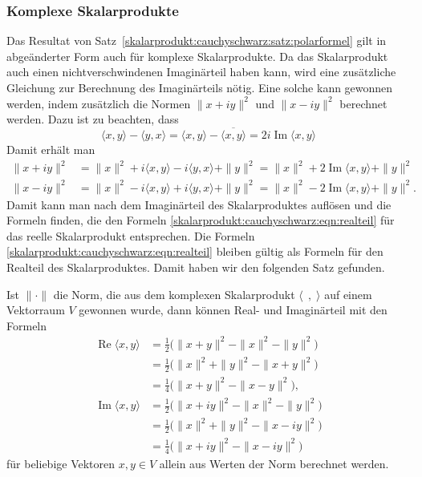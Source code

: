 \subsubsection{Komplexe Skalarprodukte}
Das Resultat von Satz~\ref{skalarprodukt:cauchyschwarz:satz:polarformel}
gilt in abgeänderter Form auch für komplexe Skalarprodukte.
Da das Skalarprodukt auch einen nichtverschwindenen Imaginärteil haben
kann, wird eine zusätzliche Gleichung zur Berechnung des Imaginärteils
nötig.
Eine solche kann gewonnen werden, indem zusätzlich die Normen
$\|x+iy\|^2$ und $\|x-iy\|^2$ berechnet werden.
Dazu ist zu beachten, dass
\[
\langle x,y\rangle
-
\langle y,x\rangle
=
\langle x,y\rangle
-
\overline{
\langle x,y\rangle
}
=
2i\operatorname{Im}\langle x,y\rangle
\]
Damit erhält man
\begin{align*}
\|x+iy\|^2 &= \|x\|^2 + i\langle x,y\rangle - i\langle y,x\rangle + \|y\|^2 
           = \|x\|^2 + 2\operatorname{Im}\langle x,y\rangle + \|y\|^2 \\
\|x-iy\|^2 &= \|x\|^2 - i\langle x,y\rangle + i\langle y,x\rangle + \|y\|^2 
           = \|x\|^2 - 2\operatorname{Im}\langle x,y\rangle + \|y\|^2.
\end{align*}
Damit kann man nach dem Imaginärteil des Skalarproduktes auflösen und
die Formeln
finden, die den Formeln
\eqref{skalarprodukt:cauchyschwarz:eqn:realteil}
für das reelle Skalarprodukt entsprechen.
Die Formeln
\eqref{skalarprodukt:cauchyschwarz:eqn:realteil}
bleiben gültig als Formeln für den Realteil des Skalarproduktes.
Damit haben wir den folgenden Satz gefunden.

\begin{satz}
%
Ist $\|\cdot\|$ die Norm, die aus dem komplexen Skalarprodukt
$\langle\;\,,\;\rangle$ auf einem Vektorraum $V$ gewonnen wurde,
dann können Real- und Imaginärteil mit den Formeln
\begin{align*}
\operatorname{Re}\langle x,y\rangle
&=
{\textstyle\frac12}\bigl(
\|x+y\|^2 - \|x\|^2 -\|y\|^2
\bigr)
\\
&=
{\textstyle\frac12}\bigl(
\|x\|^2 +\|y\|^2 - \|x+y\|^2
\bigr)
\\
&=
{\textstyle\frac14}\bigl(
\|x+y\|^2 - \|x-y\|^2
\bigr),
\\
\operatorname{Im}\langle x,y\rangle
&=
{\textstyle\frac12}\bigl(
\|x+iy\|^2-\|x\|^2-\|y\|^2
\bigr)
\\
&=
{\textstyle\frac12}\bigl(
\|x\|^2+\|y\|^2-\|x-iy\|^2
\bigr)
\\
&=
{\textstyle\frac14}\bigl(
\|x+iy\|^2
-
\|x-iy\|^2
\bigr)
\end{align*}
für beliebige Vektoren $x,y\in V$
allein aus Werten der Norm berechnet werden.
\end{satz}

